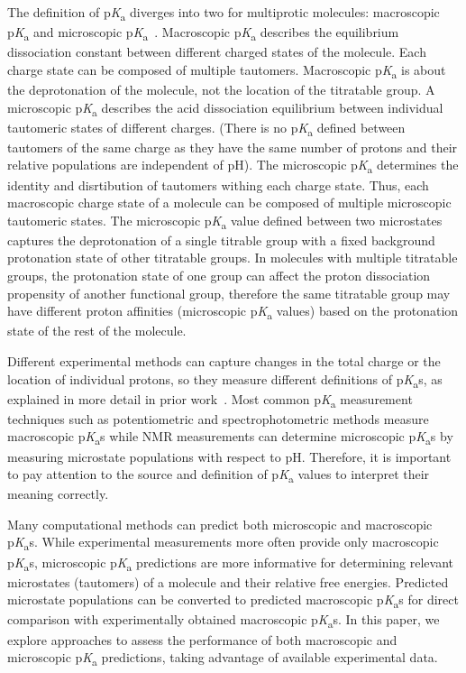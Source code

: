 \documentclass[9pt,lineno,final]{elife}
\newcommand{\pKa}{p\textit{K}\textsubscript{a}}
\begin{document}
The definition of \pKa{} diverges into two for multiprotic molecules: macroscopic \pKa{} and microscopic \pKa{}~\citep{Darvey:1995:Biochem.Educ., Bodner:1986:J.Chem.Educ., Murray:1995:Anal.Chem.}. 
Macroscopic \pKa{} describes the equilibrium dissociation constant between different charged states of the molecule. 
Each charge state can be composed of multiple tautomers. Macroscopic \pKa{} is about the deprotonation of the molecule, not the location of the titratable group. 
A microscopic \pKa{} describes the acid dissociation equilibrium between individual tautomeric states of different charges. 
(There is no \pKa{} defined between tautomers of the same charge as they have the same number of protons and their relative populations are independent of pH).
The microscopic \pKa{} determines the identity and disrtibution of tautomers withing each charge state.
Thus, each macroscopic charge state of a molecule can be composed of multiple microscopic tautomeric states.
The microscopic \pKa{} value defined between two microstates captures the deprotonation of a single titrable group with a fixed background protonation state of other titratable groups. 
In molecules with multiple titratable groups, the protonation state of one group can affect the proton dissociation propensity of another functional group, therefore the same titratable group may have different proton affinities (microscopic \pKa{} values) based on the protonation state of the rest of the molecule.

Different experimental methods can capture changes in the total charge or the location of individual protons, so they measure different definitions of \pKa{}s, as explained in more detail in prior work~\citep{Isik:2018:J.Comput.AidedMol.Des.}. 
Most common \pKa{} measurement techniques such as potentiometric and spectrophotometric methods measure macroscopic \pKa{}s while NMR measurements can determine microscopic \pKa{}s by measuring microstate populations with respect to pH. 
Therefore, it is important to pay attention to the source and definition of \pKa{} values to interpret their meaning correctly. 

Many computational methods can predict both microscopic and macroscopic \pKa{}s. While experimental measurements more often provide only macroscopic \pKa{}s,  microscopic \pKa{} predictions are more informative for determining relevant microstates (tautomers) of a molecule and their relative free energies. Predicted microstate populations can be converted to predicted macroscopic \pKa{}s for direct comparison with experimentally obtained macroscopic \pKa{}s. In this paper, we explore approaches to assess the performance of both macroscopic and microscopic \pKa{} predictions, taking advantage of available experimental data.
\end{document}
